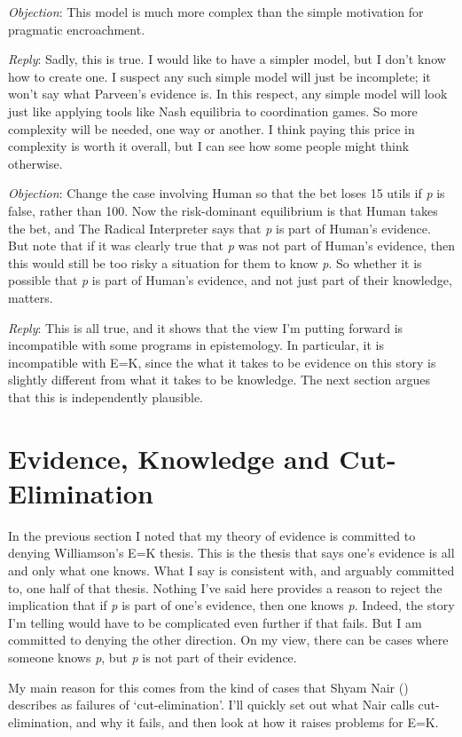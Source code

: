 \documentclass[
  10pt,
  letterpaper,
  twoside]{scrbook}
\begin{document}
\emph{Objection}: This model is much more complex than the simple
motivation for pragmatic encroachment.

\emph{Reply}: Sadly, this is true. I would like to have a simpler model,
but I don't know how to create one. I suspect any such simple model will
just be incomplete; it won't say what Parveen's evidence is. In this
respect, any simple model will look just like applying tools like Nash
equilibria to coordination games. So more complexity will be needed, one
way or another. I think paying this price in complexity is worth it
overall, but I can see how some people might think otherwise.

\emph{Objection}: Change the case involving Human so that the bet loses
15 utils if \emph{p} is false, rather than 100. Now the risk-dominant
equilibrium is that Human takes the bet, and The Radical Interpreter
says that \emph{p} is part of Human's evidence. But note that if it was
clearly true that \emph{p} was not part of Human's evidence, then this
would still be too risky a situation for them to know \emph{p}. So
whether it is possible that \emph{p} is part of Human's evidence, and
not just part of their knowledge, matters.

\emph{Reply}: This is all true, and it shows that the view I'm putting
forward is incompatible with some programs in epistemology. In
particular, it is incompatible with E=K, since the what it takes to be
evidence on this story is slightly different from what it takes to be
knowledge. The next section argues that this is independently plausible.

\section{Evidence, Knowledge and Cut-Elimination}\label{sec-cutelim}

In the previous section I noted that my theory of evidence is committed
to denying Williamson's E=K thesis. This is the thesis that says one's
evidence is all and only what one knows. What I say is consistent with,
and arguably committed to, one half of that thesis. Nothing I've said
here provides a reason to reject the implication that if \emph{p} is
part of one's evidence, then one knows \emph{p}. Indeed, the story I'm
telling would have to be complicated even further if that fails. But I
am committed to denying the other direction. On my view, there can be
cases where someone knows \emph{p}, but \emph{p} is not part of their
evidence.

My main reason for this comes from the kind of cases that Shyam Nair
() describes as failures of
`cut-elimination'. I'll quickly set out what Nair calls cut-elimination,
and why it fails, and then look at how it raises problems for E=K.
\end{document}
